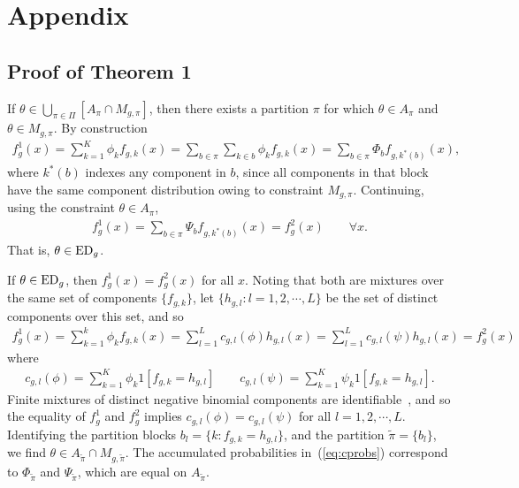 \documentclass[aoas,preprint]{imsart}
\begin{document}
%



\newpage

 
\section*{Appendix}

\subsection*{Proof of Theorem 1}

If $\theta \in \bigcup_{\pi \in \Pi} \left[ A_{\pi} \cap M_{g, \pi} \right]$, then there exists a partition $\pi$
for which $\theta \in A_\pi$ and $\theta \in M_{g,\pi}$.   By construction
\begin{eqnarray*}
f^1_g(x) = \sum_{k=1}^K \phi_k f_{g,k}(x) 
         = \sum_{b \in \pi} \sum_{k \in b} \phi_k f_{g,k}(x) 
         = \sum_{b \in \pi} \Phi_b f_{g,k^*(b)}(x) ,
\end{eqnarray*}
where $k^*(b)$ indexes any component in $b$, since all components in that block have the same component distribution
owing to constraint $M_{g,\pi}$. Continuing, using the constraint $\theta \in A_{\pi}$,
\begin{eqnarray*}
f^1_g(x) = \sum_{b \in \pi} \Psi_b f_{g,k^*(b)}(x) = f^2_g(x)   \qquad \forall x.
\end{eqnarray*}
That is, $\theta \in {\mbox {\rm ED}}_g$.


If $\theta \in {\mbox {\rm ED}}_g$, then $f^1_g(x) = f^2_g(x)$ for all $x$.  Noting that both are mixtures over
the same set of components $\{ f_{g,k} \}$, let $\{ h_{g,l} : l=1,2, \cdots, L\}$ be the set of distinct 
components over this set, and so
\begin{eqnarray*}
f^1_g(x) = \sum_{k=1}^k \phi_k f_{g,k}(x)   
         = \sum_{l=1}^L c_{g,l} (\phi) h_{g,l}(x) 
         = \sum_{l=1}^L c_{g,l} (\psi) h_{g,l}(x) 
         = f^2_g(x ) 
\end{eqnarray*}
where
\begin{eqnarray}
\label{eq:cprobs}
c_{g,l}(\phi) = \sum_{k=1}^K \phi_k 1[ f_{g,k} = h_{g,l} ]   \qquad
c_{g,l}(\psi) = \sum_{k=1}^K \psi_k 1[ f_{g,k} = h_{g,l} ]  .
\end{eqnarray}
Finite mixtures of distinct negative binomial components are identifiable~\citep{yak68}, and so the equality
of $f^1_g$ and $f^2_g$ implies $c_{g,l} (\phi) = c_{g,l} (\psi)$ for all $l=1,2, \cdots, L$.  
Identifying the partition blocks $b_l = \{ k: f_{g,k} = h_{g,l} \}$, and the partition $\tilde \pi = \{b_l\}$,
we find $\theta \in A_{\tilde \pi} \cap M_{g, \tilde \pi}$. The accumulated probabilities in~(\ref{eq:cprobs})
correspond to $\Phi_{\tilde \pi}$ and $\Psi_{\tilde \pi}$, which are equal on $A_{\tilde \pi}$.
\end{document}
